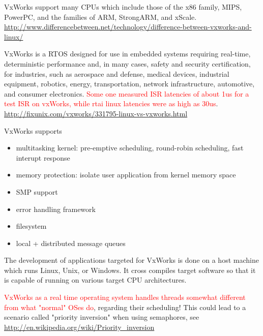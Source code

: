 VxWorks support many CPUs which include those of the x86 family, MIPS, PowerPC,
and the families of ARM, StrongARM, and xScale.
\url{http://www.differencebetween.net/technology/difference-between-vxworks-and-linux/}


VxWorks is a RTOS designed for use in embedded systems requiring real-time,
deterministic performance and, in many cases, safety and security certification,
for industries, such as aerospace and defense, medical devices, industrial
equipment, robotics, energy, transportation, network infrastructure, automotive,
and consumer electronics.
\textcolor{red}{Some one measured ISR
latencies of about 1us for a test ISR on vxWorks, while rtai linux
latencies were as high as 30us}.
\url{http://fixunix.com/vxworks/331795-linux-vs-vxworks.html}

VxWorks supports
\begin{itemize}
  \item multitasking kernel: pre-emptive scheduling, round-robin scheduling,
  fast interupt response
  
  \item  memory protection: isolate user application from kernel memory space
  
  \item SMP support
  
  \item error handling framework
  
  \item filesystem
  
  \item local + distributed message queues
\end{itemize}

The development of applications targeted for VxWorks is done on a host machine
which runs Linux, Unix, or Windows. It cross compiles target software so that it
is capable of running on various target CPU architectures.


\textcolor{red}{VxWorks as a real time operating system handles threads somewhat
different from what "normal" OSes do}, regarding their scheduling! This could
lead to a scenario called "priority inversion" when using semaphores, see
\url{http://en.wikipedia.org/wiki/Priority_inversion}

